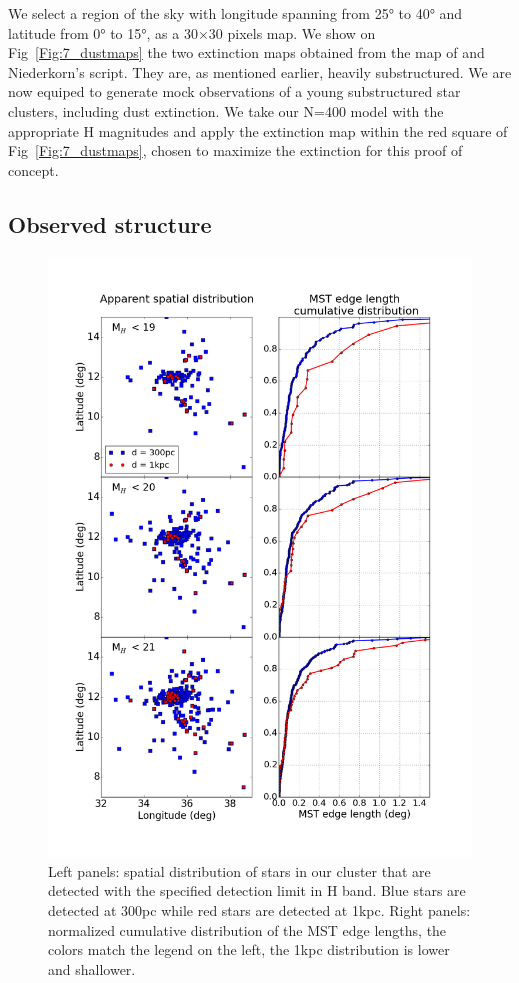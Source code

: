 We select a region of the sky with longitude spanning from 25° to 40° and latitude from 0° to 15°, as a 30$\times$30 pixels map. We show on Fig~\ref{Fig:7_dustmaps} the two extinction maps obtained from the map of \cite{Green2015} and Niederkorn's script. They are, as mentioned earlier, heavily substructured. We are now equiped to generate mock observations of a young substructured star clusters, including dust extinction. We take our \HubLem N=400 model with the appropriate H magnitudes and apply the extinction map within the red square of Fig~\ref{Fig:7_dustmaps}, chosen to maximize the extinction for this proof of concept.

\subsection*{Observed structure}


\begin{figure}
\begin{center}
\includegraphics[width=\textwidth]{Figures/7_MSTedge.png}
\end{center}
\caption{Left panels: spatial distribution of  stars in our cluster that are detected with the specified detection limit in H band. Blue stars are detected at 300pc while red stars are detected at 1kpc. Right panels: normalized cumulative distribution of the MST edge lengths, the colors match the legend on the left, the 1kpc distribution is lower and shallower.}
\label{Fig:7_MSTedge}
\end{figure} 


